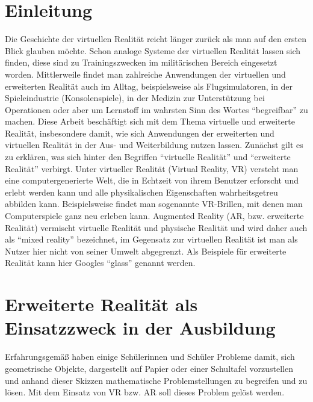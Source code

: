 \documentclass[deutsch]{llncs}
\begin{document}
\tableofcontents
\newpage


\section{Einleitung}
\label{sec:intro}
Die Geschichte der virtuellen Realität reicht länger zurück als man auf den ersten Blick glauben möchte. Schon analoge Systeme der virtuellen Realität lassen sich finden, diese sind zu Trainingszwecken im militärischen Bereich eingesetzt worden.
Mittlerweile findet man zahlreiche Anwendungen der virtuellen und erweiterten Realität auch im Alltag, beispielsweise als Flugsimulatoren, in der Spieleindustrie (Konsolenspiele), in der Medizin zur Unterstützung bei Operationen oder aber um Lernstoff im wahrsten Sinn des Wortes ``begreifbar'' zu machen. 
Diese Arbeit beschäftigt sich mit dem Thema virtuelle und erweiterte Realität, insbesondere damit, wie sich Anwendungen der erweiterten und virtuellen Realität in der Aus- und Weiterbildung nutzen lassen. 
Zunächst gilt es zu erklären, was sich hinter den Begriffen ``virtuelle Realität'' und ``erweiterte Realität'' verbirgt.
Unter virtueller Realität (Virtual Reality, VR) versteht man eine computergenerierte Welt, die in Echtzeit von ihrem Benutzer erforscht und erlebt werden kann und alle physikalischen Eigenschaften wahrheitsgetreu abbilden kann. 
Beispielsweise findet man sogenannte VR-Brillen, mit denen man Computerspiele ganz neu erleben kann.
Augmented Reality (AR, bzw. erweiterte Realität) vermischt virtuelle Realität und physische Realität und wird daher auch als ``mixed reality'' bezeichnet, im Gegensatz zur virtuellen Realität ist man als Nutzer hier nicht von seiner Umwelt abgegrenzt.
Als Beispiele für erweiterte Realität kann hier Googles ``glass'' genannt werden.



\section{Erweiterte Realität als Einsatzzweck in der Ausbildung}
\label{sec:typo}
Erfahrungsgemäß haben einige Schülerinnen und Schüler Probleme damit, sich geometrische Objekte, dargestellt auf Papier oder einer Schultafel vorzustellen und anhand dieser Skizzen mathematische Problemstellungen zu begreifen und zu lösen. Mit dem Einsatz von VR bzw. AR soll dieses Problem gelöst werden.
\end{document}
